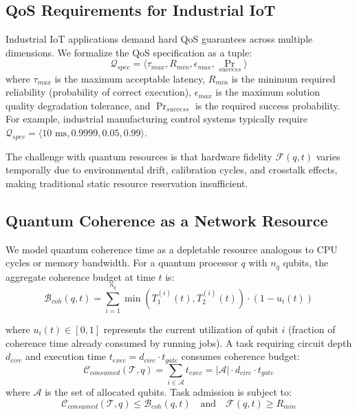 \documentclass[lettersize,journal]{IEEEtran}
\begin{document}
\subsection{QoS Requirements for Industrial IoT}
\label{subsec:qos_requirements}

Industrial IoT applications demand hard QoS guarantees across multiple dimensions. We formalize the QoS specification as a tuple:
\begin{equation}
\mathcal{Q}_{spec} = \langle \tau_{max}, R_{min}, \epsilon_{max}, \Pr_{success} \rangle
\label{eq:qos_spec}
\end{equation}
where $\tau_{max}$ is the maximum acceptable latency, $R_{min}$ is the minimum required reliability (probability of correct execution), $\epsilon_{max}$ is the maximum solution quality degradation tolerance, and $\Pr_{success}$ is the required success probability. For example, industrial manufacturing control systems typically require $\mathcal{Q}_{spec} = \langle 10\text{ ms}, 0.9999, 0.05, 0.99 \rangle$.

The challenge with quantum resources is that hardware fidelity $\mathcal{F}(q, t)$ varies temporally due to environmental drift, calibration cycles, and crosstalk effects, making traditional static resource reservation insufficient.

\subsection{Quantum Coherence as a Network Resource}
\label{subsec:coherence_resource}

We model quantum coherence time as a depletable resource analogous to CPU cycles or memory bandwidth. For a quantum processor $q$ with $n_q$ qubits, the aggregate coherence budget at time $t$ is:
\begin{equation}
\mathcal{B}_{coh}(q, t) = \sum_{i=1}^{n_q} \min(T_1^{(i)}(t), T_2^{(i)}(t)) \cdot (1 - u_i(t))
\label{eq:coherence_budget}
\end{equation}

where $u_i(t) \in [0,1]$ represents the current utilization of qubit $i$ (fraction of coherence time already consumed by running jobs). A task requiring circuit depth $d_{circ}$ and execution time $t_{exec} = d_{circ} \cdot t_{gate}$ consumes coherence budget:
\begin{equation}
\mathcal{C}_{consumed}(\mathcal{T}, q) = \sum_{i \in \mathcal{A}} t_{exec} = |\mathcal{A}| \cdot d_{circ} \cdot t_{gate}
\label{eq:coherence_consumed}
\end{equation}
where $\mathcal{A}$ is the set of allocated qubits. Task admission is subject to:
\begin{equation}
\mathcal{C}_{consumed}(\mathcal{T}, q) \leq \mathcal{B}_{coh}(q, t) \quad \text{and} \quad \mathcal{F}(q, t) \geq R_{min}
\label{eq:admission_control}
\end{equation}
\end{document}
